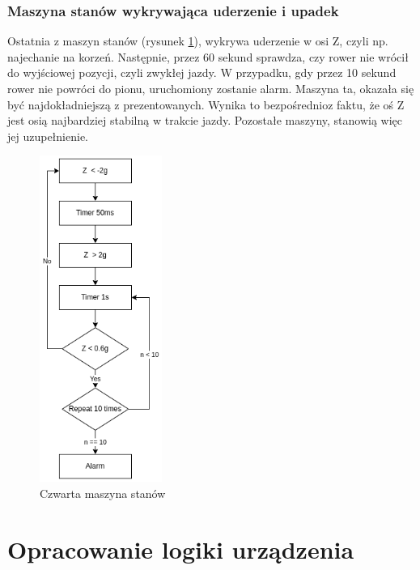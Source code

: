 \subsubsection{Maszyna stanów wykrywająca uderzenie i upadek}
Ostatnia z maszyn stanów (rysunek \ref{img:fsm4}), wykrywa uderzenie w osi Z, czyli np. najechanie na korzeń. Następnie, przez 60 sekund sprawdza, czy rower nie wrócił do wyjściowej pozycji, czyli zwykłej jazdy. W przypadku, gdy przez 10 sekund rower nie powróci do pionu, uruchomiony zostanie alarm. Maszyna ta, okazała się być najdokładniejszą z prezentowanych. Wynika to bezpośrednioz faktu, że oś Z jest osią najbardziej stabilną w trakcie jazdy. Pozostałe maszyny, stanowią więc jej uzupełnienie.
\begin{figure}[h]
    \centering
    \includegraphics[width=4cm]{Graphics/Z_axis_FSM.png}
    \caption{Czwarta maszyna stanów}
    \label{img:fsm4}
\end{figure}

\section{Opracowanie logiki urządzenia}

